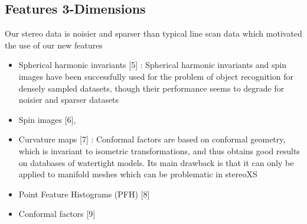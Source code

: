 \subsection{Features 3-Dimensions}
Our stereo data is noisier and sparser than typical line scan data which
motivated the use of our new features

    \begin{itemize}
        \item Spherical harmonic invariants [5] : Spherical harmonic invariants and spin images have been
          successfully used for the problem of object recognition for
          densely sampled datasets, though their performance seems
          to degrade for noisier and sparser datasets

        \item Spin images [6], 
        \item Curvature maps [7] :  Conformal factors are
          based on conformal geometry, which is invariant to isometric
          transformations, and thus obtains good results on databases
          of watertight models. Its main drawback is that it can only
          be applied to manifold meshes which can be problematic
          in stereoXS
        \item Point Feature Histograms (PFH) [8]
        \item Conformal factors [9]
    \end{itemize}




